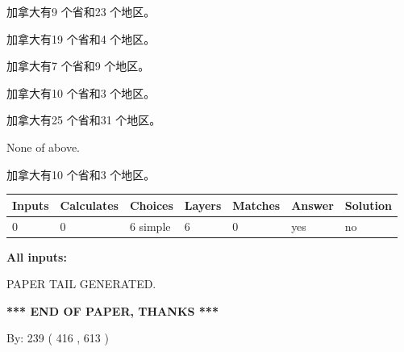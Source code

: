 \documentclass{ctexart}
\begin{document}
 
加拿大有9 个省和23 个地区。
 
 
加拿大有19 个省和4 个地区。
 
 
加拿大有7 个省和9 个地区。
 
 
加拿大有10 个省和3 个地区。
 
 
加拿大有25 个省和31 个地区。
 
 
 None of above.
 
 
\noindent{}
 
 
加拿大有10 个省和3 个地区。
 
 
\noindent{}
 
 
   
   
   
   
\noindent\begin{tabular}{|l|l|l|l|l|l|l|}
 \hline
Inputs & Calculates & Choices & Layers & Matches & Answer & Solution \\ \hline
 0  & 
 0  & 
 6
  simple  
  & 
 6  & 
 0  & 
  yes & 
  no 
  \\ \hline
 \end{tabular}
   
   
   
   
\noindent{}
   
   
   
   
\noindent\vspace{0.1in}\hspace{-0.08in} {\textbf{\Large{All inputs: }}}
   
   
   
   
   
   
 \vspace{0.2in}
 
   
   
\vspace{2.0in} PAPER TAIL GENERATED.
   
   
   
   
\vspace{1.0in} 
{\textbf{\large{ *** END OF PAPER, THANKS *** }}} 
   
   
\hspace{1.0in} By: 
 239 ( 416 ,  613 )
   
\end{document}
